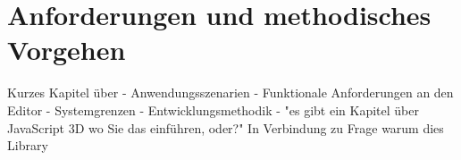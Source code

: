 \section{Anforderungen und methodisches Vorgehen}\label{sec:Anforderungen}

Kurzes Kapitel über
- Anwendungsszenarien \newline
- Funktionale Anforderungen an den Editor \newline
- Systemgrenzen \newline
- Entwicklungsmethodik \newline
- "es gibt ein Kapitel über JavaScript 3D wo Sie das einführen, oder?" In Verbindung zu Frage warum dies Library \newline